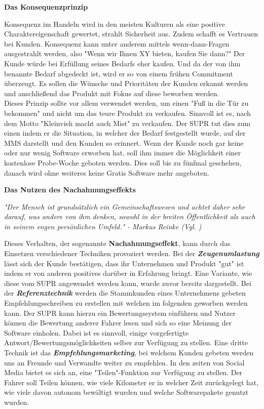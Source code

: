 \begin{large}
	\textbf{Das Konsequenzprinzip}\\
\end{large}
Konsequenz im Handeln wird in den meisten Kulturen als eine positive Charaktereigenschaft gewertet, strahlt Sicherheit aus. Zudem schafft es Vertrauen bei Kunden. Konsequenz kann unter anderem mittels wenn-dann-Fragen ausgestrahlt werden, also "Wenn wir Ihnen XY bieten, kaufen Sie dann?" Der Kunde würde bei Erfüllung seines Bedarfs eher kaufen. Und da der von ihm benannte Bedarf abgedeckt ist, wird er so von einem frühen Commitment überzeugt. Es sollen die Wünsche und Prioritäten der Kunden erkannt werden und anschließend das Produkt mit Fokus auf diese beworben werden.\\
Dieses Prinzip sollte vor allem verwendet werden, um einen "Fuß in die Tür zu bekommen" und nicht um das teure Produkt zu verkaufen. Sinnvoll ist es, nach dem Motto "Kleinvieh macht auch Mist" zu verkaufen. Der SUPR tut dies zum einen indem er die Situation, in welcher der Bedarf festgestellt wurde, auf der MMS darstellt und den Kunden so erinnert. Wenn der Kunde noch gar keine oder nur wenig Software erworben hat, soll ihm immer die Möglichkeit einer kostenlose Probe-Woche geboten werden. Dies soll bis zu fünfmal geschehen, danach wird ohne weiteres keine Gratis Software mehr angeboten.\\

\begin{large}
	\textbf{Das Nutzen des Nachahmungseffekts}\cite[S. 67fff.]{vkPsy}
\end{large}
\begin{center}
	\textit{"Der Mensch ist grundsätzlich ein Gemeinschaftswesen und achtet daher sehr darauf, was andere von ihm denken, sowohl in der breiten Öffentlichkeit als auch in seinem engen persönlichen Umfeld." - Markus Reinke (Vgl. )\cite[S. 67]{vkPsy} }\\
\end{center}
Dieses Verhalten, der sogenannte \textbf{Nachahmungseffekt}, kann durch das Einsetzen verschiedener Techniken provoziert werden. Bei der \textbf{\textit{Zeugenumlastung}} lässt sich der Kunde bestätigen, dass ihr Unternehmen und Produkt "gut" ist indem er von anderen positives darüber in Erfahrung bringt. Eine Variante, wie diese vom SUPR angewendet werden kann, wurde zuvor bereits dargestellt. Bei der \textbf{\textit{Referenztechnik}} werden die Stammkunden eines Unternehmens gebeten Empfehlungsschreiben zu erstellen mit welchen im folgenden geworben werden kann. Der SUPR kann hierzu ein Bewertungssystem einführen und Nutzer können die Bewertung anderer Fahrer lesen und sich so eine Meinung der Software einholen. Dabei ist es sinnvoll, einige vorgefertigte Antwort/Bewertungsmöglichkeiten selber zur Verfügung zu stellen. Eine dritte Technik ist das \textbf{\textit{Empfehlungsmarketing}}, bei welchem Kunden gebeten werden uns an Freunde und Verwandte weiter zu empfehlen. In den zeiten von Social Media bietet es sich an, eine "Teilen"-Funktion zur Verfügung zu stellen. Der Fahrer soll Teilen können, wie viele Kilometer er in welcher Zeit zurückgelegt hat, wie viele davon autonom bewältigt wurden und welche Softwarepakete genutzt wurden.\\

